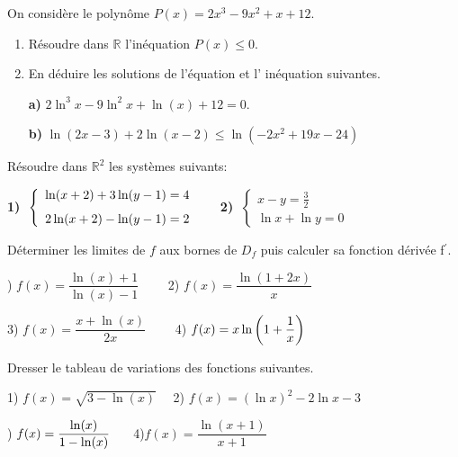 \begin{exercice}
On considère le polynôme $ P(x)=2x^{3}-9x^{2}+x+12$.
\begin{enumerate}
\item Résoudre dans $ \mathbb{R} $   l'inéquation $ P(x)\leq0 $.
\item En déduire les  solutions  de l'équation et l' inéquation suivantes.

\medskip

\textbf{a)}\;  $2\ln^{3}x-9\ln^{2} x+\ln(x)+12=0 $.

\medskip
\textbf{b)}\; $\ln(2x-3) +2\ln(x-2) \leq\ln(-2x^{2}+19x-24)$


\end{enumerate}
\end{exercice}
\begin{exercice}
 Résoudre dans $ \mathbb{R}^{2} $  les systèmes suivants:
\medskip

\textbf{1)} $\; \left\{\begin{array}{l}  \ln(x+2)+3 \ln(y-1)=4 \\[0.25cm]  2\ln(x+2)-\ln(y-1) =2 \end{array}\right. \hspace*{0.5cm}$
\textbf{2)} $\;  \left\{\begin{array}{l} x-y=\frac{3}{2} \\[0.25cm]  \ln x+\ln y=0 \end{array}\right.$

\end{exercice}

\begin{exercice}
Déterminer les limites  de $ f $ aux bornes de $ D_f $ puis  calculer sa fonction dérivée f$^{\prime} $.

)  $ f(x)=\dfrac{\ln(x)+1}{\ln(x)-1}\qquad $     2) $ f(x)= \dfrac{\ln(1+2x)}{x} $ 
\medskip

   3) $ f(x)=\dfrac{x+\ln(x)}{2x} \qquad$  4)  $ f(x)= x \ln\left(1+\dfrac{1}{x}\right)  $ 
\end{exercice}
\begin{exercice}
Dresser le tableau de variations  des fonctions suivantes.\medskip

1) $ f(x)=\sqrt{3-\ln(x)} \quad$  2) $ f(x)= (\ln x)^{2}-2\ln x-3 $


) $ f(x)= \dfrac{\ln(x)}{1-\ln(x)}\hspace*{0.5cm}$   4)$ f(x)= \dfrac{\ln(x+1)}{x+1} $

\end{exercice}


